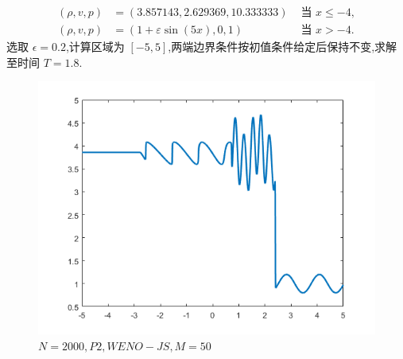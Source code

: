 \documentclass{book}
\begin{document}
\begin{example}
    \begin{equation}
        \begin{aligned}
            (\rho, v, p) & =(3.857143,2.629369,10.333333)   & \text { 当 } x \leq-4, \\
            (\rho, v, p) & =(1+\varepsilon \sin (5 x), 0,1) & \text { 当 } x>-4 .
        \end{aligned}
    \end{equation}
    选取 $\epsilon = 0.2$,计算区域为 $[-5,5]$,两端边界条件按初值条件给定后保持不变,求解至时间 $T=1.8$.
    \begin{figure}[htp]
        \centering
        \label{fig:shu_Osher}
        \includegraphics[width=0.7\linewidth]{fig/Shu_Osher.png}
        \caption{$N=2000,P2,WENO-JS,M=50$}
    \end{figure}
\end{example}
\end{document}
